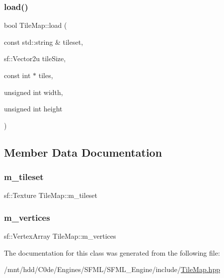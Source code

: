 \mbox{\label{classTileMap_a5bc3325e2382599c3f986ac64481e832}} 
\subsubsection{\texorpdfstring{load()}{load()}}
{\footnotesize\ttfamily bool Tile\+Map\+::load (\begin{DoxyParamCaption}\item[{const std\+::string \&}]{tileset,  }\item[{sf\+::\+Vector2u}]{tile\+Size,  }\item[{const int $\ast$}]{tiles,  }\item[{unsigned int}]{width,  }\item[{unsigned int}]{height }\end{DoxyParamCaption})\hspace{0.3cm}{\ttfamily [inline]}}



\subsection{Member Data Documentation}
\mbox{\label{classTileMap_a8be6cb9e600cfd213ba6499aabbcc50b}} 
\subsubsection{\texorpdfstring{m\+\_\+tileset}{m\_tileset}}
{\footnotesize\ttfamily sf\+::\+Texture Tile\+Map\+::m\+\_\+tileset\hspace{0.3cm}{\ttfamily [private]}}

\mbox{\label{classTileMap_a1070824d191a06562a31df73cbe7fe99}} 
\subsubsection{\texorpdfstring{m\+\_\+vertices}{m\_vertices}}
{\footnotesize\ttfamily sf\+::\+Vertex\+Array Tile\+Map\+::m\+\_\+vertices\hspace{0.3cm}{\ttfamily [private]}}



The documentation for this class was generated from the following file\+:\begin{DoxyCompactItemize}
\item 
/mnt/hdd/\+C0de/\+Engines/\+S\+F\+M\+L/\+S\+F\+M\+L\+\_\+\+Engine/include/\hyperlink{TileMap_8hpp}{Tile\+Map.\+hpp}\end{DoxyCompactItemize}
